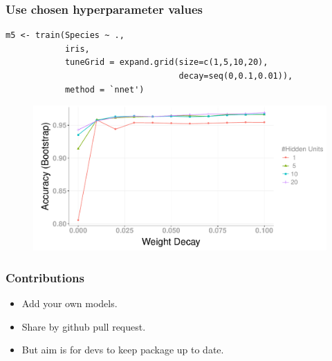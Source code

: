 \documentclass{beamer}
\begin{document}
\begin{frame}[fragile]
\frametitle{Use chosen hyperparameter values}
\renewcommand{\FancyVerbFormatLine}[1]{%
   \ifnum\value{FancyVerbLine}=3\color{cyan}#1%
   \else%
   \ifnum\value{FancyVerbLine}=4\color{cyan}#1%
   \else #1\fi\fi}

\begin{Verbatim}
m5 <- train(Species ~ ., 
            iris,
            tuneGrid = expand.grid(size=c(1,5,10,20), 
                                   decay=seq(0,0.1,0.01)),
            method = `nnet')
\end{Verbatim}

\begin{figure}
    \includegraphics[height = 0.5\textheight]{train_nnet_tuneGrid}
\end{figure} 
\end{frame} 





\begin{frame}
\frametitle{Contributions}
	\begin{itemize}
	\item Add your own models.
	\item Share by github pull request.
	\item But aim is for devs to keep package up to date.
	\end{itemize}
\end{frame} 






\end{document}
